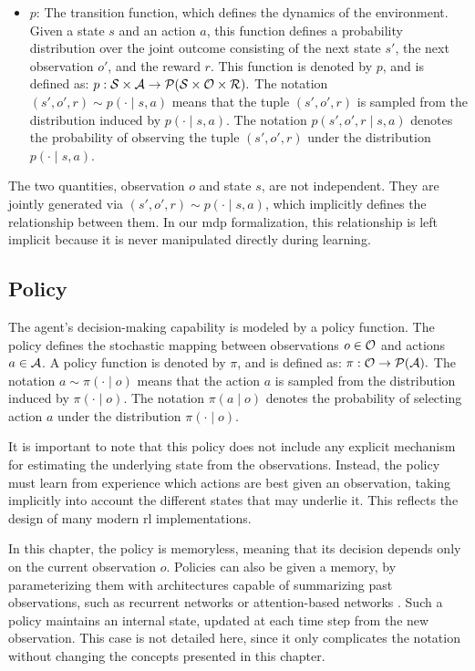 \begin{itemize}
    \item \textbf{\(p\)}: The transition function, which defines the dynamics of the environment.  
    Given a state \(s\) and an action \(a\), this function defines a probability distribution over the joint outcome consisting of the next state \(s'\), the next observation \(o'\), and the reward \(r\).  
    This function is denoted by \(p\), and is defined as:
    \(
    p : \mathcal{S} \times \mathcal{A} \to \mathcal{P}(\mathcal{S} \times \mathcal{O} \times \mathcal{R}).
    \)
    The notation \((s', o', r) \sim p(\cdot \mid s, a)\) means that the tuple \((s', o', r)\) is sampled from the distribution induced by \(p(\cdot \mid s, a)\).  
    The notation \(p(s', o', r \mid s, a)\) denotes the probability of observing the tuple \((s', o', r)\) under the distribution \(p(\cdot \mid s, a)\).
\end{itemize}

The two quantities, observation \(o\) and state \(s\), are not independent.
They are jointly generated via \((s', o', r) \sim p(\cdot \mid s, a)\), which implicitly defines the relationship between them.
In our \gls{mdp} formalization, this relationship is left implicit because it is never manipulated directly during learning.

\subsection{Policy}
\label{subsec:policy}

The agent's decision-making capability is modeled by a policy function.  
The policy defines the stochastic mapping between observations \(o \in \mathcal{O}\) and actions \(a \in \mathcal{A}\).  
A policy function is denoted by \(\pi\), and is defined as:
\(
\pi : \mathcal{O} \to \mathcal{P}(\mathcal{A}).
\)
The notation \(a \sim \pi(\cdot \mid o)\) means that the action \(a\) is sampled from the distribution induced by \(\pi(\cdot \mid o)\).  
The notation \(\pi(a \mid o)\) denotes the probability of selecting action \(a\) under the distribution \(\pi(\cdot \mid o)\).

It is important to note that this policy does not include any explicit mechanism for estimating the underlying state from the observations.
Instead, the policy must learn from experience which actions are best given an observation, taking implicitly into account the different states that may underlie it.
This reflects the design of many modern \gls{rl} implementations.

In this chapter, the policy is memoryless, meaning that its decision depends only on the current observation \(o\).
Policies can also be given a memory, by parameterizing them with architectures capable of summarizing past observations, such as recurrent networks \parencite{hochreiter1997long, hausknecht2015deep, kapturowski2019recurrent} or attention-based networks \parencite{vaswani2017attention, parisotto2020stabilizing}.
Such a policy maintains an internal state, updated at each time step from the new observation.
This case is not detailed here, since it only complicates the notation without changing the concepts presented in this chapter.

